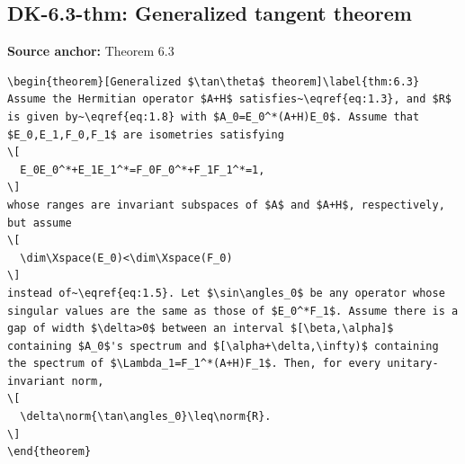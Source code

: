 \subsection*{DK-6.3-thm: Generalized tangent theorem}
\noindent\textbf{Source anchor:} Theorem 6.3\\
\begin{verbatim}
\begin{theorem}[Generalized $\tan\theta$ theorem]\label{thm:6.3}
Assume the Hermitian operator $A+H$ satisfies~\eqref{eq:1.3}, and $R$ is given by~\eqref{eq:1.8} with $A_0=E_0^*(A+H)E_0$. Assume that $E_0,E_1,F_0,F_1$ are isometries satisfying
\[
  E_0E_0^*+E_1E_1^*=F_0F_0^*+F_1F_1^*=1,
\]
whose ranges are invariant subspaces of $A$ and $A+H$, respectively, but assume
\[
  \dim\Xspace(E_0)<\dim\Xspace(F_0)
\]
instead of~\eqref{eq:1.5}. Let $\sin\angles_0$ be any operator whose singular values are the same as those of $E_0^*F_1$. Assume there is a gap of width $\delta>0$ between an interval $[\beta,\alpha]$ containing $A_0$'s spectrum and $[\alpha+\delta,\infty)$ containing the spectrum of $\Lambda_1=F_1^*(A+H)F_1$. Then, for every unitary-invariant norm,
\[
  \delta\norm{\tan\angles_0}\leq\norm{R}.
\]
\end{theorem}
\end{verbatim}

